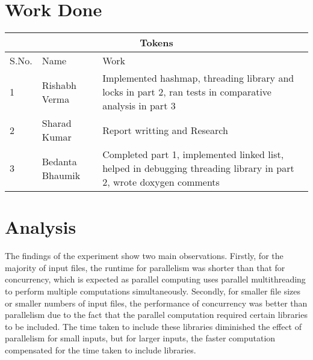 \documentclass{article}
\begin{document}
\section{Work Done}
\begin{tabular}{ |p{1cm}|p{3cm}|p{8cm}| }
 \hline
 \multicolumn{3}{|c|}{Tokens} \\
 \hline
 S.No.& Name&Work\\
 \hline
1   & Rishabh Verma    &  Implemented hashmap, threading library and locks in part 2, ran tests in comparative analysis in part 3 \\
\hline
2   &   Sharad Kumar &  Report writting and Research  \\
\hline
3   & Bedanta Bhaumik    &Completed part 1, implemented linked list, helped in debugging threading library in part 2, wrote doxygen comments  \\


 \hline
\end{tabular}

\section{Analysis}
The findings of the experiment show two main observations. Firstly, for the majority of input files, the runtime for parallelism was shorter than that for concurrency, which is expected as parallel computing uses parallel multithreading to perform multiple computations simultaneously. Secondly, for smaller file sizes or smaller numbers of input files, the performance of concurrency was better than parallelism due to the fact that the parallel computation required certain libraries to be included. The time taken to include these libraries diminished the effect of parallelism for small inputs, but for larger inputs, the faster computation compensated for the time taken to include libraries.
\end{document}
